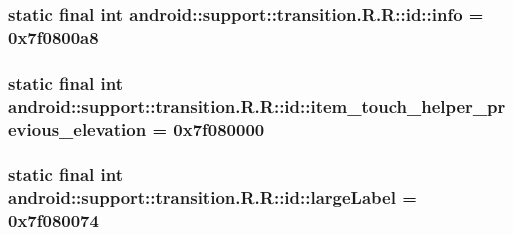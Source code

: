 \hypertarget{classandroid_1_1support_1_1transition_1_1_r_1_1id_872cd7531fa662414849de66d579e2f9}{
\subsubsection[{info}]{\setlength{\rightskip}{0pt plus 5cm}static final int android::support::transition.R.R::id::info = 0x7f0800a8}}
\label{classandroid_1_1support_1_1transition_1_1_r_1_1id_872cd7531fa662414849de66d579e2f9}


\hypertarget{classandroid_1_1support_1_1transition_1_1_r_1_1id_36b72b1d58140c3551a3eb32e51c3aeb}{
\subsubsection[{item\_\-touch\_\-helper\_\-previous\_\-elevation}]{\setlength{\rightskip}{0pt plus 5cm}static final int android::support::transition.R.R::id::item\_\-touch\_\-helper\_\-previous\_\-elevation = 0x7f080000}}
\label{classandroid_1_1support_1_1transition_1_1_r_1_1id_36b72b1d58140c3551a3eb32e51c3aeb}


\hypertarget{classandroid_1_1support_1_1transition_1_1_r_1_1id_9931a9b12c8b87661ef8b95eeb7258eb}{
\subsubsection[{largeLabel}]{\setlength{\rightskip}{0pt plus 5cm}static final int android::support::transition.R.R::id::largeLabel = 0x7f080074}}
\label{classandroid_1_1support_1_1transition_1_1_r_1_1id_9931a9b12c8b87661ef8b95eeb7258eb}


